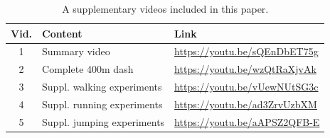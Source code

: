 \begin{table}[!]
\scriptsize
\centering
\caption{A supplementary videos included in this paper.}
\label{tab:video_list}
\begin{tabular}{|c|l|l|}
\hline
\multicolumn{1}{|l|}{\textbf{Vid.}} & \textbf{Content} & \textbf{Link} \\ \hline
1 & Summary video & \url{https://youtu.be/sQEnDbET75g} \\ \hline
2 & Complete 400m dash & \url{https://youtu.be/wzQtRaXjvAk} \\ \hline
3 & Suppl. walking experiments & \url{https://youtu.be/vUewNUtSG3c} \\ \hline 
4 & Suppl. running experiments & \url{https://youtu.be/ad3ZrvUzbXM} \\ \hline
5 & Suppl. jumping experiments & \url{https://youtu.be/aAPSZ2QFB-E}\\ \hline
\end{tabular}
\end{table}
